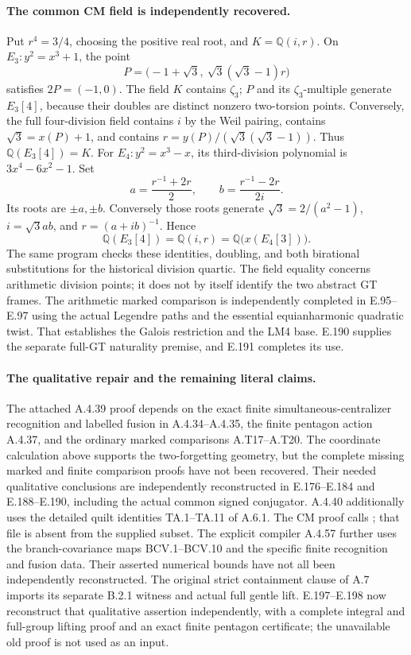 \paragraph{The common CM field is independently recovered.}
Put $r^4=3/4$, choosing the positive real root, and
$K=\mathbb Q(i,r)$.  On $E_3:y^2=x^3+1$, the point
\[
 P=\bigl(-1+\sqrt3,\ \sqrt3(\sqrt3-1)r\bigr)
\]
satisfies $2P=(-1,0)$.  The field $K$ contains $\zeta_3$;
$P$ and its $\zeta_3$-multiple generate $E_3[4]$, because
their doubles are distinct nonzero two-torsion points.
Conversely, the full four-division field contains $i$ by
the Weil pairing, contains $\sqrt3=x(P)+1$, and contains
$r=y(P)/(\sqrt3(\sqrt3-1))$.  Thus
$\mathbb Q(E_3[4])=K$.
For $E_4:y^2=x^3-x$, its third-division polynomial is
$3x^4-6x^2-1$.  Set
\[
 a=\frac{r^{-1}+2r}{2},\qquad
 b=\frac{r^{-1}-2r}{2i}.
\]
Its roots are $\pm a,\pm b$.  Conversely those roots generate
$\sqrt3=2/(a^2-1)$, $i=\sqrt3 ab$, and
$r=(a+ib)^{-1}$.  Hence
\[
       \mathbb Q(E_3[4])=\mathbb Q(i,r)
                       =\mathbb Q\bigl(x(E_4[3])\bigr).
\]
The same program checks these identities, doubling, and both
birational substitutions for the historical division quartic.
The field equality concerns arithmetic division points; it does
not by itself identify the two abstract GT frames.
The arithmetic marked comparison is independently completed in
E.95--E.97 using the actual Legendre paths and the essential
equianharmonic quadratic twist.  That establishes the Galois
restriction and the LM4 base.  E.190 supplies the separate
full-GT naturality premise, and E.191 completes its use.

\paragraph{The qualitative repair and the remaining literal claims.}
The attached A.4.39 proof depends on the exact finite
simultaneous-centralizer recognition and labelled fusion in
A.4.34--A.4.35, the finite pentagon action A.4.37, and the
ordinary marked comparisons A.T17--A.T20.  The coordinate
calculation above supports the two-forgetting geometry, but
the complete missing marked and finite comparison proofs have
not been recovered.  Their needed qualitative conclusions
are independently reconstructed in E.176--E.184 and
E.188--E.190, including the actual common signed conjugator.
A.4.40 additionally uses the detailed
quilt identities TA.1--TA.11 of A.6.1.  The CM proof calls
; that file is absent from the
supplied subset.  The explicit compiler A.4.57 further uses
the branch-covariance maps BCV.1--BCV.10 and the specific
finite recognition and fusion data.  Their asserted numerical
bounds have not all been independently reconstructed.
The original strict containment clause of A.7 imports its
separate B.2.1 witness and actual full gentle lift.  E.197--E.198
now reconstruct that qualitative assertion independently,
with a complete integral and full-group lifting proof and
an exact finite pentagon certificate; the unavailable old
proof is not used as an input.

